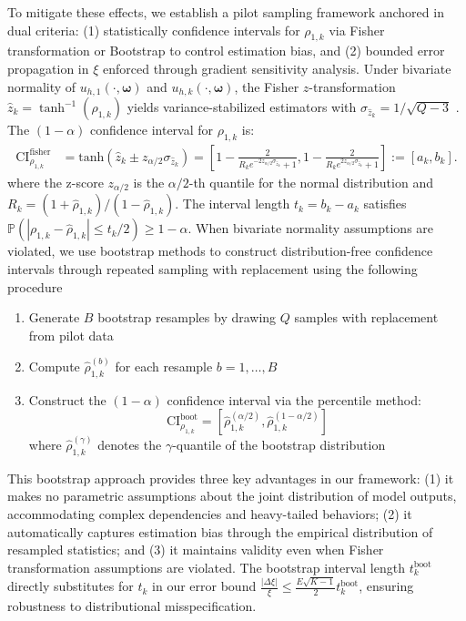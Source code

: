 To mitigate these effects, we establish a pilot sampling framework anchored in dual criteria: (1) statistically confidence intervals for $\rho_{1,k}$ via Fisher transformation \cite{BiHi:2017,BoWr:1998, FiHaPe:1957,Fi:1915, Fi:1921} or Bootstrap \cite{BeDeToMeBaRo:2007,Ef:1979,EfTi:1993} to control estimation bias, and (2) bounded error propagation in $\xi$ enforced through gradient sensitivity analysis. Under bivariate normality of $u_{h,1}(\cdot, \boldsymbol{\omega})$ and $u_{h,k}(\cdot, \boldsymbol{\omega})$, the Fisher $z$-transformation $\widehat z_k = \tanh^{-1}(\widehat \rho_{1,k})$ yields variance-stabilized estimators with $\sigma_{\widehat z_k} = 1/\sqrt{Q-3}$ \cite{BiHi:2017,BoWr:1998, FiHaPe:1957,Fi:1915, Fi:1921}. The $(1-\alpha)$ confidence interval for $\rho_{1,k}$ is:
%
\begin{align}
    \label{eq:Confidence_Interval_rho}
    \text{CI}_{\rho_{1,k}}^{\text{fisher}} &= \text{tanh}\left(\widehat z_k \pm  z_{\alpha/2}\sigma_{\widehat z_k}\right)
    =\left[1-\frac{2}{R_k e^{-2z_{\alpha/2}\sigma_{\widehat z_k}}+1}, 1-\frac{2}{R_k e^{2z_{\alpha/2}\sigma_{\widehat z_k}}+1}\right] := [a_k,b_k].
\end{align}
%
where the z-score $z_{\alpha/2}$ is the $\alpha/2$-th quantile for the normal distribution and $R_k = (1+\widehat\rho_{1,k})/(1-\widehat\rho_{1,k})$.
The interval length $t_k=b_k - a_k$ satisfies $ \mathbb{P}(|\rho_{1,k}-\widehat \rho_{1,k}|\le t_k/2)\ge 1-\alpha$. When bivariate normality assumptions are violated, we use bootstrap methods to construct distribution-free confidence intervals through repeated sampling with replacement using the following procedure
%
\begin{enumerate}
    \item Generate $B$ bootstrap resamples by drawing $Q$ samples with replacement from pilot data
    \item Compute $\widehat{\rho}_{1,k}^{(b)}$ for each resample $b = 1,\dots,B$
    \item Construct the $(1-\alpha)$ confidence interval via the percentile method:
    \[
    \text{CI}_{\rho_{1,k}}^{\text{boot}} = \left[ \widehat{\rho}_{1,k}^{(\alpha/2)}, \widehat{\rho}_{1,k}^{(1-\alpha/2)} \right]
    \]
    where $\widehat{\rho}_{1,k}^{(\gamma)}$ denotes the $\gamma$-quantile of the bootstrap distribution
\end{enumerate}
%
This bootstrap approach provides three key advantages in our framework: (1) it makes no parametric assumptions about the joint distribution of model outputs, accommodating complex dependencies and heavy-tailed behaviors; (2) it automatically captures estimation bias through the empirical distribution of resampled statistics; and (3) it maintains validity even when Fisher transformation assumptions are violated. The bootstrap interval length $t_k^{\text{boot}}$ directly substitutes for $t_k$ in our error bound $\frac{|\Delta \xi|}{\xi} \leq \frac{E\sqrt{K-1}}{2} t_k^{\text{boot}}$, ensuring robustness to distributional misspecification.

